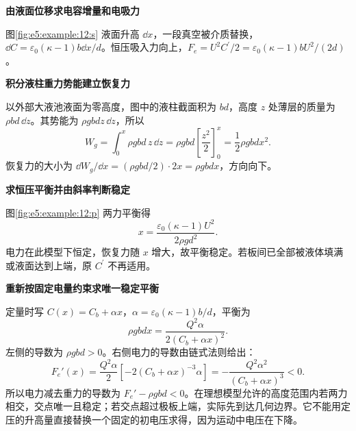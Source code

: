 \begin{solution}\textbf{由液面位移求电容增量和电吸力}\par\nobreak
图\ref{fig:e5:example:12:s} 液面升高 $\dd x$，一段真空被介质替换，$\dd C=\varepsilon_0(\kappa-1)b\dd x/d$。恒压吸入力向上，$F_e=U^2C^\prime/2=\varepsilon_0(\kappa-1)bU^2/(2d)$。

\par\medskip{}\noindent\textbf{积分液柱重力势能建立恢复力}\par\nobreak
以外部大液池液面为零高度，图中的液柱截面积为 $bd$，高度 $z$ 处薄层的质量为 $\rho bd\,\dd z$。其势能为 $\rho gbdz\,\dd z$，所以
\[
W_g=\int_0^x\rho gbd\,z\,\dd z
=\rho gbd\left[\frac{z^2}{2}\right]_0^x
=\frac12\rho gbdx^2.
\]
恢复力的大小为 $\dd W_g/\dd x=(\rho gbd/2)\cdot2x=\rho gbdx$，方向向下。



\par\medskip{}\noindent\textbf{求恒压平衡并由斜率判断稳定}\par\nobreak
图\ref{fig:e5:example:12:p} 两力平衡得
\[
 x=\frac{\varepsilon_0(\kappa-1)U^2}{2\rho gd^2}.
\]
电力在此模型下恒定，恢复力随 $x$ 增大，故平衡稳定。若板间已全部被液体填满或液面达到上端，原 $C^\prime$ 不再适用。



\par\medskip{}\noindent\textbf{重新按固定电量约束求唯一稳定平衡}\par\nobreak
定量时写 $C(x)=C_b+\alpha x$，$\alpha=\varepsilon_0(\kappa-1)b/d$，平衡为
\[
 \rho gbdx=\frac{Q^2\alpha}{2(C_b+\alpha x)^2}.
\]
左侧的导数为 $\rho gbd>0$。右侧电力的导数由链式法则给出：
\[
F_e'(x)=\frac{Q^2\alpha}{2}[-2(C_b+\alpha x)^{-3}\alpha]
=-\frac{Q^2\alpha^2}{(C_b+\alpha x)^3}<0.
\]
所以电力减去重力的导数为 $F_e'-\rho gbd<0$。在理想模型允许的高度范围内若两力相交，交点唯一且稳定；若交点超过极板上端，实际先到达几何边界。它不能用定压的升高量直接替换一个固定的初电压求得，因为运动中电压在下降。\end{solution}
